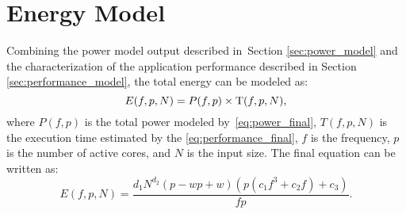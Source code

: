 \section{Energy Model} \label{sec:energy_model}
Combining the power model output described in~Section \ref{sec:power_model} and the characterization of the application performance described in Section \ref{sec:performance_model}, the total energy can be modeled as:
\begin{equation}
	E(f,p,N)=P(f,p)\times{\rm T}(f,p,N),
	\label{eq:en_combination}
\end{equation}
where $P(f,p)$ is the total power modeled by~\cref{eq:power_final}, ${T}(f,p,N)$ is the execution time estimated by the \cref{eq:performance_final}, $f$ is the frequency, $p$ is the number of active cores, and $N$ is the input size. The final equation can be written as:
\begin{equation}
	E(f,p,N)=\frac{d_1N^{d_2}(p-wp+w)(p(c_1f^3+c_2f)+c_3)}{fp}.
	\label{eq:en_final}
\end{equation}